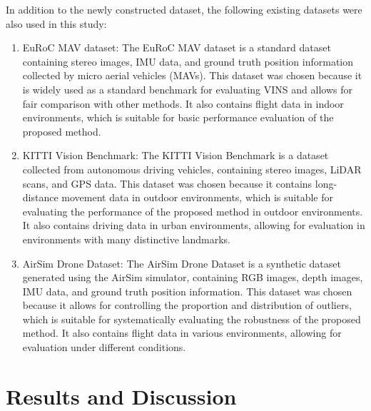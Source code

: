 \documentclass[a4paper,fleqn,10pt,twocolumn]{SICE_ISCS}
\begin{document}
In addition to the newly constructed dataset, the following existing datasets were also used in this study:

\begin{enumerate}
\item EuRoC MAV dataset:
   The EuRoC MAV dataset is a standard dataset containing stereo images, IMU data, and ground truth position information collected by micro aerial vehicles (MAVs). This dataset was chosen because it is widely used as a standard benchmark for evaluating VINS and allows for fair comparison with other methods. It also contains flight data in indoor environments, which is suitable for basic performance evaluation of the proposed method.

\item KITTI Vision Benchmark:
   The KITTI Vision Benchmark is a dataset collected from autonomous driving vehicles, containing stereo images, LiDAR scans, and GPS data. This dataset was chosen because it contains long-distance movement data in outdoor environments, which is suitable for evaluating the performance of the proposed method in outdoor environments. It also contains driving data in urban environments, allowing for evaluation in environments with many distinctive landmarks.

\item AirSim Drone Dataset:
   The AirSim Drone Dataset is a synthetic dataset generated using the AirSim simulator, containing RGB images, depth images, IMU data, and ground truth position information. This dataset was chosen because it allows for controlling the proportion and distribution of outliers, which is suitable for systematically evaluating the robustness of the proposed method. It also contains flight data in various environments, allowing for evaluation under different conditions.
\end{enumerate}

\section{Results and Discussion}
\end{document}

